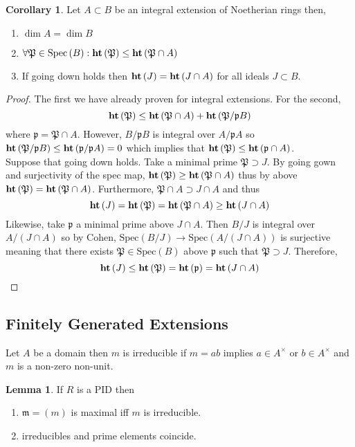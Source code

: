 \documentclass[12pt]{article}
\newcommand{\Spec}[1]{\mathrm{Spec}\left( #1 \right)}
\newcommand{\p}{\mathfrak{p}}
\renewcommand{\P}{\mathfrak{P}}
\newcommand{\m}{\mathfrak{m}}
\theoremstyle{remark}
\theoremstyle{definition}
\newtheorem{lemma}[theorem]{Lemma}
\newtheorem{corollary}[theorem]{Corollary}
\newenvironment{definition}[1][Definition:]{\begin{trivlist}
\item[\hskip \labelsep {\bfseries #1}]}{\end{trivlist}}
\begin{document}
\begin{corollary}
Let $A \subset B$ be an integral extension of Noetherian rings then,
\begin{enumerate}
\item $\dim{A} = \dim{B}$
\item $\forall \P \in \Spec{B} : \height{\P} \le \height{\P \cap A}$
\item If going down holds then $\mathbf{ht}\left( J \right) = \mathbf{ht}\left( J \cap A \right)$ for all ideals $J \subset B$.
\end{enumerate}
\end{corollary}

\begin{proof}
The first we have already proven for integral extensions. For the second,
\[ \height{\P} \le \height{\P \cap A} + \height{\P / \p B} \]
where $\p = \P \cap A$. However, $B / \p B$ is integral over $A / \p A$ so $\height{\P / \p B} \le \height{\p / \p A} =  0$ which implies that $\height{\P} \le \height{\p \cap A}$. 
\bigskip\\
Suppose that going down holds. Take a minimal prime $\P \supset J$. By going gown and surjectivity of the spec map, $\height{\P} \ge \height{\P \cap A}$ thus by above $\height{\P} = \height{\P \cap A}$. Furthermore, $\P \cap A \supset J \cap A$ and thus 
\[ \height{J} = \height{\P} = \height{\P \cap A} \ge \height{J \cap A} \]
Likewise, take $\p$ a minimal prime above $J \cap A$. Then $B / J$ is integral over $A / (J \cap A)$ so by Cohen, $\Spec{B/J} \to \Spec{A / (J \cap A)}$ is surjective meaning that there exists $\P \in \Spec{B}$ above $\p$ such that $\P \supset J$. Therefore,
\[ \height{J} \le \height{\P} = \height{\p} = \height{J \cap A} \]  
\end{proof}

\subsection{Finitely Generated Extensions}

\begin{definition}
Let $A$ be a domain then $m$ is irreducible if $m = ab$ implies $a \in A^\times$ or $b \in A^\times$ and $m$ is a non-zero non-unit. 
\end{definition}

\begin{lemma}
If $R$ is a PID then 
\begin{enumerate}
\item $\m = (m)$ is maximal iff $m$ is irreducible. 
\item irreducibles and prime elements coincide. 
\end{enumerate}
\end{lemma}
\end{document}
